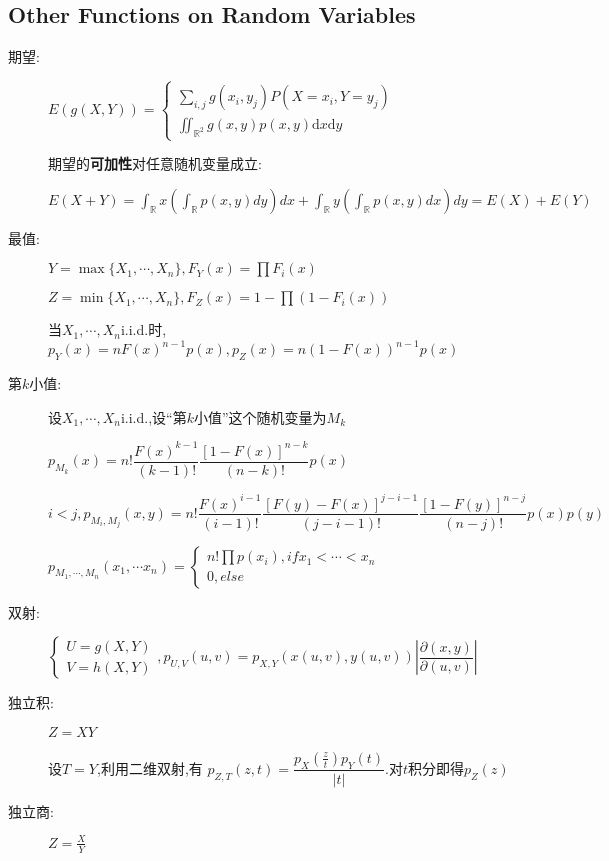 \subsection{Other Functions on Random Variables}
\begin{description}
  \item[期望:]
    $ E(g(X,Y))=\begin{cases}\sum_{i,j}g(x_i,y_j)P(X=x_i,Y=y_j)\\\iint_{\mathbb{R}^2}g(x,y)p(x,y)\mathrm{d}x\mathrm{d}y \end{cases}$

    期望的\textbf{可加性}对任意随机变量成立:

    $ E(X+Y)=\int_{\mathbb{R}}x(\int_{\mathbb{R}}p(x,y)dy)dx+\int_{\mathbb{R}}y(\int_{\mathbb{R}}p(x,y)dx)dy = E(X)+E(Y)$

  \item[最值:]
    $ Y=\max\{ X_1,\cdots, X_n\}, F_Y(x) = \prod{F_i(x)}$

    $ Z = \min\{ X_1,\cdots ,X_n\}, F_Z(x) = 1-\prod{(1-F_i(x))}$

    当$ X_1,\cdots ,X_n$i.i.d.时,$ p_Y(x)=nF(x)^{n-1}p(x), p_Z(x)=n(1-F(x))^{n-1}p(x)$
  \item[第$ k$小值:]设$ X_1,\cdots ,X_n$i.i.d.,设``第$ k$小值''这个随机变量为$ M_k$

      $ p_{M_k}(x)=n!\dfrac{F(x)^{k-1}}{(k-1)!}\dfrac{[1-F(x)]^{n-k}}{(n-k)!}p(x)$

      $i<j, p_{M_i,M_j}(x,y)=n!\dfrac{F(x)^{i-1}}{(i-1)!}\dfrac{[F(y)-F(x)]^{j-i-1}}{(j-i-1)!}\dfrac{[1-F(y)]^{n-j}}{(n-j)!}p(x)p(y)$

      $ p_{M_1,\cdots ,M_n}(x_1,\cdots x_n)=\begin{cases}n!\prod{p(x_i)},if x_1<\cdots <x_n\\0,else \end{cases}$
  \item[双射:]
   $ \begin{cases}U=g(X,Y)\\V=h(X,Y)\end{cases},p_{U,V}(u,v) = p_{X,Y}(x(u,v),y(u,v))|\dfrac{\partial(x,y)}{\partial(u,v)}|$

  \item[独立积:]$ Z=XY$\hfill

   设$T = Y$,利用二维双射,有 $p_{Z,T}(z,t) = \dfrac{p_X(\frac{z}{t})p_Y(t)}{|t|}$.对$ t$积分即得$ p_Z(z)$

 \item[独立商:]$ Z=\frac{X}{Y}$\hfill


\end{description}
